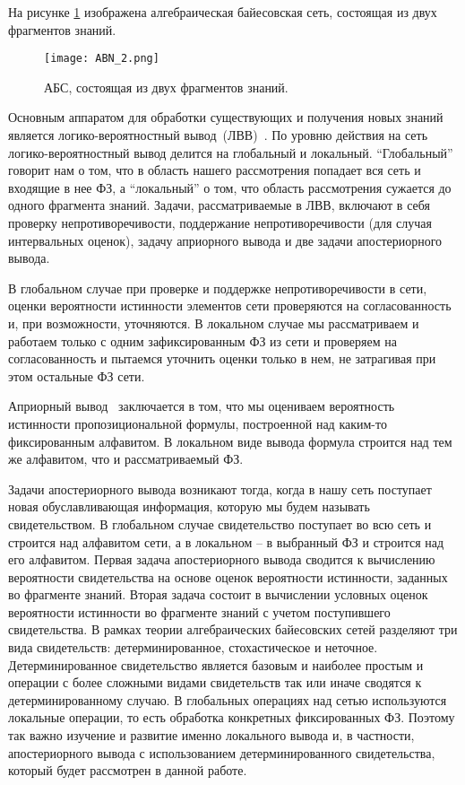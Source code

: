 На рисунке \ref{ABN} изображена алгебраическая байесовская сеть, состоящая из двух фрагментов знаний.

\begin{figure}[h!]
  \begin{center}
    \texttt{[image: ABN\_2.png]}
    \caption{АБС, состоящая из двух фрагментов знаний.}
    \label{ABN}
  \end{center}
\end{figure}
    
Основным аппаратом для обработки существующих и получения новых знаний является логико-вероятностный вывод~(ЛВВ)~\cite{nsmv}. По уровню действия на сеть логико-вероятностный вывод делится на глобальный и локальный. ``Глобальный'' говорит нам о том, что в область нашего рассмотрения попадает вся сеть и входящие в нее ФЗ, а ``локальный'' о том, что область рассмотрения сужается до одного фрагмента знаний. Задачи, рассматриваемые в ЛВВ, включают в себя проверку непротиворечивости, поддержание непротиворечивости (для случая интервальных оценок), задачу априорного вывода и две задачи апостериорного вывода. 
    
В глобальном случае при проверке и поддержке непротиворечивости в сети, оценки вероятности истинности элементов сети проверяются на согласованность и, при возможности, уточняются. В локальном случае мы рассматриваем и работаем только с одним зафиксированным ФЗ из сети и проверяем на согласованность и пытаемся уточнить оценки только в нем, не затрагивая при этом остальные ФЗ сети. 
    
Априорный вывод~\cite{tul} заключается в том, что мы оцениваем вероятность истинности пропозициональной формулы, построенной над каким-то фиксированным алфавитом. В локальном виде вывода формула строится над тем же алфавитом, что и рассматриваемый ФЗ.
    
Задачи апостериорного вывода возникают тогда, когда в нашу сеть поступает новая обуславливающая информация, которую мы будем называть свидетельством. В глобальном случае свидетельство поступает во всю сеть и строится над алфавитом сети, а в локальном -- в выбранный ФЗ и строится над его алфавитом. Первая задача апостериорного вывода сводится к вычислению вероятности свидетельства на основе оценок вероятности истинности, заданных во фрагменте знаний. Вторая задача состоит в вычислении условных оценок вероятности истинности во фрагменте знаний с учетом поступившего свидетельства. В рамках теории алгебраических байесовских сетей разделяют три вида свидетельств: детерминированное, стохастическое и неточное. Детерминированное свидетельство является базовым и наиболее простым и операции с более сложными видами свидетельств так или иначе сводятся к детерминированному случаю. В глобальных операциях над сетью используются локальные операции, то есть обработка конкретных фиксированных ФЗ. Поэтому так важно изучение и развитие именно локального вывода и, в частности, апостериорного вывода с использованием детерминированного свидетельства, который будет рассмотрен в данной работе. 
    
